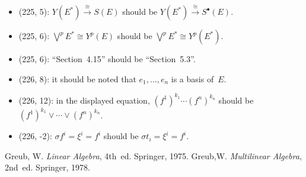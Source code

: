 \documentclass[letterpaper,12pt]{article}
\newcommand{\iso}{\cong}
\newcommand{\smprod}{\vee}
\newcommand{\bigsmprod}{\bigvee}
\begin{document}
\begin{itemize}
\item (225, 5): \(Y(E^*)\stackrel{\iso}{\to}S(E)\) should be \(Y(E^*)\stackrel{\iso}{\to}S^{\bullet}(E)\).
\item (225, 6): \(\bigsmprod^p E^*\iso Y^p(E)\) should be \(\bigsmprod^p E^*\iso Y^p(E^*)\).
\item (225, 6): ``Section~4.15'' should be ``Section~5.3''.
\item (226, 8): it should be noted that \(e_1,\ldots,e_n\) is a basis of~\(E\).
\item (226, 12): in the displayed equation, \((f^1)^{k_1}\cdots(f^n)^{k_n}\) should be \((f^1)^{k_1}\smprod\cdots\smprod(f^n)^{k_n}\).
\item (226, -2): \(\sigma f^i=\xi^i=f^i\) should be \(\sigma t_i=\xi^i=f^i\).
\end{itemize}

\begin{thebibliography}{0}
 Greub, W. \textit{Linear Algebra}, 4th~ed. Springer, 1975.
 Greub,W. \textit{Multilinear Algebra}, 2nd~ed. Springer, 1978.
\end{thebibliography}
\end{document}
